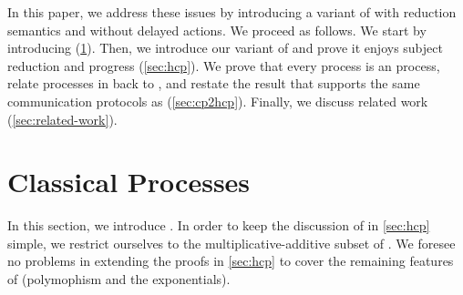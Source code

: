 \documentclass[submission,copyright,creativecommons]{eptcs}
\begin{document}
In this paper, we address these issues by introducing a variant of \hcp with reduction semantics and without delayed actions. We proceed as follows. We start by introducing \cp (\cref{sec:cp}). Then, we introduce our variant of \hcp and prove it enjoys subject reduction and progress (\cref{sec:hcp}). We prove that every \cp process is an \hcp process, relate processes in \hcp back to \cp, and restate the result that \hcp supports the same communication protocols as \cp (\cref{sec:cp2hcp}). Finally, we discuss related work (\cref{sec:related-work}).

\section{Classical Processes}
\label{sec:cp}

In this section, we introduce \cp. In order to keep the discussion of \hcp in \cref{sec:hcp} simple, we restrict ourselves to the multiplicative-additive subset of \cp. We foresee no problems in extending the proofs in \cref{sec:hcp} to cover the remaining features of \cp (polymophism and the exponentials).
\end{document}
